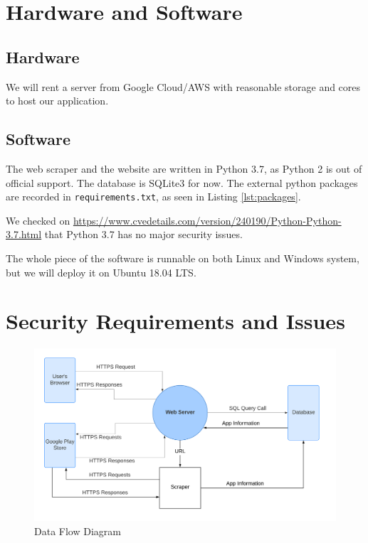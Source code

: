 \documentclass[12pt, a4paper]{article}
\def\overleafhome{/tmp}%
\newcommand{\code}[1]{\texttt{#1}}
\begin{document}
\section{Hardware and Software}
\subsection{Hardware}
We will rent a server from Google Cloud/AWS with reasonable storage and cores to host our application.

\subsection{Software}
The web scraper and the website are written in Python 3.7, as Python 2 is out of official support. The database is SQLite3 for now. The external python packages are recorded in \code{requirements.txt}, as seen in Listing \ref{lst:packages}.

We checked on \url{https://www.cvedetails.com/version/240190/Python-Python-3.7.html} that Python 3.7 has no major security issues.



The whole piece of the software is runnable on both Linux and Windows system, but we will deploy it on Ubuntu 18.04 LTS.


\section{Security Requirements and Issues}

\begin{figure}[ht]
\centering
\includegraphics[width=1\textwidth]{Data_Flow_Diagram.png}
\caption{Data Flow Diagram}
\label{fig:Data_Flow}
\end{figure}
\end{document}
